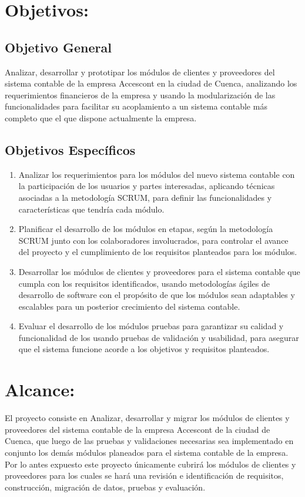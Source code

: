 \documentclass{article}
\begin{document}
\section{Objetivos:}

\subsection{Objetivo General}

Analizar, desarrollar y prototipar los módulos de clientes y proveedores del sistema contable de la empresa Accescont en la ciudad de Cuenca, analizando los requerimientos financieros de la empresa y usando la modularización de las funcionalidades para facilitar su acoplamiento a un sistema contable más completo que el que dispone actualmente la empresa.  
\subsection{Objetivos Específicos}

\begin{enumerate}
    \item Analizar los requerimientos para los módulos del nuevo sistema contable con la participación de los usuarios y partes interesadas, aplicando técnicas asociadas a la metodología SCRUM, para definir las funcionalidades y características que tendría cada módulo.  
    
    \item Planificar el desarrollo de los módulos en etapas, según la metodología SCRUM junto con los colaboradores involucrados, para controlar el avance del proyecto y el cumplimiento de los requisitos planteados para los módulos.
    
    \item Desarrollar los módulos de clientes y proveedores para el sistema contable que cumpla con los requisitos identificados, usando metodologías ágiles de desarrollo de software con el propósito de que los módulos sean adaptables y escalables para un posterior crecimiento del sistema contable.  
    
    \item Evaluar el desarrollo de los módulos pruebas para garantizar su calidad y funcionalidad de los usando pruebas de validación y usabilidad, para asegurar que el sistema funcione acorde a los objetivos y requisitos planteados.  
\end{enumerate}


\section{Alcance:}
El proyecto consiste en Analizar, desarrollar y migrar los módulos de clientes y proveedores del sistema contable de la empresa Accescont de la ciudad de Cuenca, que luego de las pruebas y validaciones necesarias sea implementado en conjunto los demás módulos planeados para el sistema contable de la empresa. Por lo antes expuesto este proyecto únicamente cubrirá los módulos de clientes y proveedores para los cuales se hará una revisión e identificación de requisitos, construcción, migración de datos, pruebas y evaluación.
\end{document}
